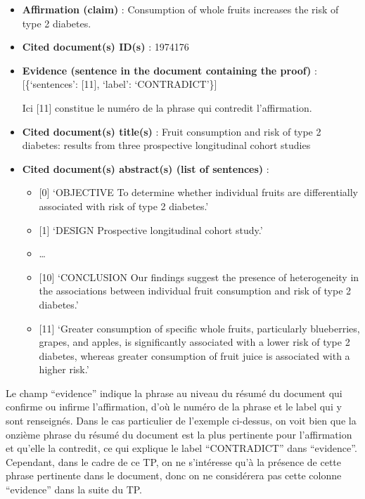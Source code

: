 \documentclass[11pt]{article}
\providecommand{\tightlist}{%
      \setlength{\itemsep}{0pt}\setlength{\parskip}{0pt}}
\begin{document}
\begin{itemize}
\item
  \textbf{Affirmation (claim)} : Consumption of whole fruits increases
  the risk of type 2 diabetes.
\item
  \textbf{Cited document(s) ID(s)} : 1974176
\item
  \textbf{Evidence (sentence in the document containing the proof)} :
  {[}\{`sentences': {[}11{]}, `label': `CONTRADICT'\}{]}

  Ici {[}11{]} constitue le numéro de la phrase qui contredit
  l'affirmation.
\item
  \textbf{Cited document(s) title(s)} : Fruit consumption and risk of
  type 2 diabetes: results from three prospective longitudinal cohort
  studies
\item
  \textbf{Cited document(s) abstract(s) (list of sentences)} :

  \begin{itemize}
  \tightlist
  \item
    {[}0{]} `OBJECTIVE To determine whether individual fruits are
    differentially associated with risk of type 2 diabetes.\n'
  \item
    {[}1{]} `DESIGN Prospective longitudinal cohort study.'
  \item
    \ldots{}
  \item
    {[}10{]} `CONCLUSION Our findings suggest the presence of
    heterogeneity in the associations between individual fruit
    consumption and risk of type 2 diabetes.'
  \item
    {[}11{]} `Greater consumption of specific whole fruits, particularly
    blueberries, grapes, and apples, is significantly associated with a
    lower risk of type 2 diabetes, whereas greater consumption of fruit
    juice is associated with a higher risk.'
  \end{itemize}
\end{itemize}

Le champ ``evidence'' indique la phrase au niveau du résumé du document
qui confirme ou infirme l'affirmation, d'où le numéro de la phrase et le
label qui y sont renseignés. Dans le cas particulier de l'exemple
ci-dessus, on voit bien que la onzième phrase du résumé du document est
la plus pertinente pour l'affirmation et qu'elle la contredit, ce qui
explique le label ``CONTRADICT'' dans ``evidence''. Cependant, dans le
cadre de ce TP, on ne s'intéresse qu'à la présence de cette phrase
pertinente dans le document, donc on ne considérera pas cette colonne
``evidence'' dans la suite du TP.
\end{document}
